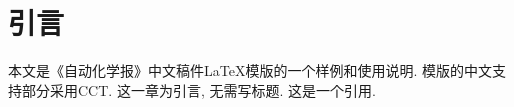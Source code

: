 \section{引言}
本文是《自动化学报》中文稿件\LaTeX 模版的一个样例和使用说明. 模版的中文支持部分采用CCT. 这一章为引言, 无需写标题.
这是一个引用\cite{ran1996modeling}.
